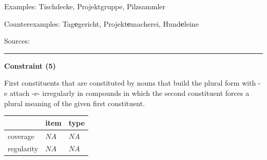 \noindent
Examples: Tisch{\zeroLinker}decke, Projekt{\zeroLinker}gruppe, Pilz{\zeroLinker}sammler

\noindent
Counterexamples: Tag\textbf{e}gericht, Projekt\textbf{e}macherei, Hund\textbf{e}leine

\vspace{0.3em}

\noindent
Sources: \citet[83]{ortner_mueller-bollhagen_1991}

\vspace{0.35em}
\hrule




\vspace{0.4em}

\begin{center}
\textbf{Constraint (5)}
\end{center}

\noindent
First constituents that are constituted by nouns that build the plural form with -e attach -e- irregularly in compounds in which the second constituent forces a plural meaning of the given first constituent.
\vspace{0.5em}


\vspace{-0.25em}

\begin{table}[!ht]
\begin{center}
\setlength{\extrarowheight}{1pt}
\begin{tabularx}{\columnwidth}{|X|X|X|}
\hline
 & item & type \\
\hline
 coverage & $NA$ & $NA$ \\
\hline
 regularity & $NA$ & $NA$ \\
\hline
\end{tabularx}
\end{center}
\end{table}

\vspace{-1.35em}

